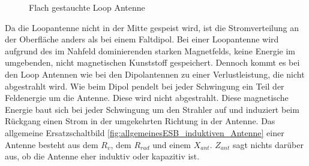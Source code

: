 \begin{figure}[!ht]
	\begin{center}
	\end{center}
\caption{Flach gestauchte Loop Antenne}
\label{fig:FflacheLoopAntenne}
\end{figure}

Da  die Loopantenne nicht in der Mitte gespeist wird, ist die Stromverteilung an der Oberfläche anders als bei einem Faltdipol. Bei einer Loopantenne wird aufgrund des im Nahfeld dominierenden starken Magnetfelds, keine Energie im umgebenden, nicht magnetischen  Kunststoff gespeichert. Dennoch kommt es bei den Loop Antennen wie bei den Dipolantennen zu einer Verlustleistung, die nicht abgestrahlt wird. Wie beim Dipol pendelt bei jeder Schwingung ein Teil der Feldenergie um die Antenne. Diese wird nicht abgestrahlt. Diese magnetische Energie baut sich bei jeder Schwingung um den Strahler auf und induziert beim Rückgang einen Strom in der umgekehrten Richtung in der Antenne. Das allgemeine Ersatzschaltbild \ref{fig:allgemeinesESB_induktiven_Antenne} einer Antenne besteht aus dem $R_{v}$, dem $R_{rad}$ und einem $X_{ant}$. $Z_{ant}$ sagt nichts darüber aus, ob die Antenne eher induktiv oder kapazitiv ist.



